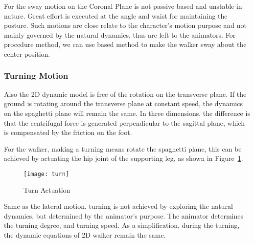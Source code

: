 {For the sway motion on the Coronal Plane is not passive based and unstable in nature\citep{kuo1999stabilization}.
Great effort is executed at the angle and waist for maintaining the posture.
Such motions are close relate to the character's motion purpose and not mainly governed by the natural dynamics, thus are left to the animators.
For procedure method, we can use \pd based method to make the walker sway about the center position.


\subsubsection*{Turning Motion}
Also the 2D dynamic model is free of the rotation on the transverse plane.
If the ground is rotating around the transverse plane at constant speed, the dynamics on the spaghetti plane will remain the same.
In three dimensions, the difference is that the centrifugal force is generated perpendicular to the sagittal plane, which is  compensated by the friction on the foot.

For the walker,  making a turning means rotate the spaghetti plane, this can be achieved by actuating the  hip joint of the supporting leg, as shown in Figure~\ref{fig:turn}.


\begin{figure}[!htbp]
  \begin{center}
      \texttt{[image: turn]}
    \caption{Turn Actuation}
    \label{fig:turn}
\end{center}
\end{figure}


Same as the lateral motion, turning is not achieved by exploring the natural dynamics, but determined by the animator's purpose.
The animator determines the turning degree, and turning speed.
As a simplification, during the turning, the dynamic equations of 2D walker remain the same.





}
